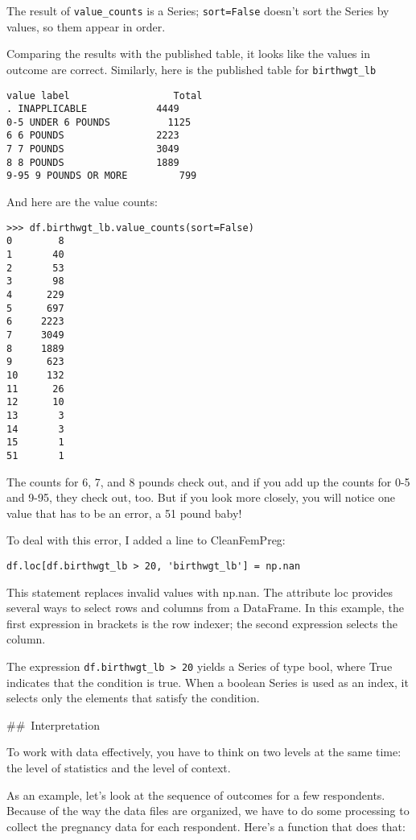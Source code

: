 \documentclass[]{book}
\begin{document}
The result of \texttt{value\_counts} is a Series;
\texttt{sort=False} doesn't sort the Series by values, so them appear in
order.

Comparing the results with the published
table, it looks like the values in outcome are correct. Similarly,
here is the published table for \texttt{birthwgt\_lb}

\begin{verbatim}
value label                  Total
. INAPPLICABLE            4449
0-5 UNDER 6 POUNDS          1125
6 6 POUNDS                2223
7 7 POUNDS                3049
8 8 POUNDS                1889
9-95 9 POUNDS OR MORE         799
\end{verbatim}

And here are the value counts:

\begin{verbatim}
>>> df.birthwgt_lb.value_counts(sort=False)
0        8
1       40
2       53
3       98
4      229
5      697
6     2223
7     3049
8     1889
9      623
10     132
11      26
12      10
13       3
14       3
15       1
51       1
\end{verbatim}

The counts for 6, 7, and 8 pounds check
out, and if you add up the counts for 0-5 and 9-95, they check out, too.
But if you look more closely, you will notice one value that has to be
an error, a 51 pound baby!

To deal with this error, I added a line
to CleanFemPreg:

\begin{verbatim}
df.loc[df.birthwgt_lb > 20, 'birthwgt_lb'] = np.nan
\end{verbatim}

This statement replaces invalid values
with np.nan. The attribute
loc provides several ways to
select rows and columns from a DataFrame. In this example, the first
expression in brackets is the row indexer; the second expression selects
the column.

The expression \texttt{df.birthwgt\_lb\ \textgreater{}\ 20}
yields a Series of type bool,
where True indicates that the condition is true. When a boolean Series
is used as an index, it selects only the elements that satisfy the
condition.

\#\#~Interpretation

To work with data effectively, you have
to think on two levels at the same time: the level of statistics and the
level of context.

As an example, let's look at the sequence
of outcomes for a few respondents. Because of the way the data files are
organized, we have to do some processing to collect the pregnancy data
for each respondent. Here's a function that does that:
\end{document}

